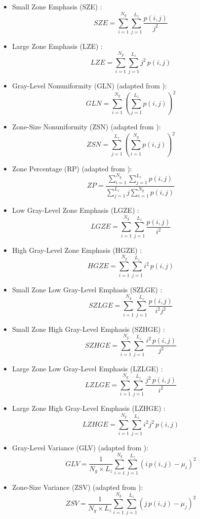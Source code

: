 \documentclass{article}
\begin{document}
\begin{itemize}
	\item Small Zone Emphasis (SZE) \cite{GallowayMM1975,ThibaultG2009}:
		  \[SZE = \sum_{i=1}^{N_g}\sum_{j=1}^{L_z} \frac{p(i,j)}{j^2}\]
	\item Large Zone Emphasis (LZE) \cite{GallowayMM1975,ThibaultG2009}:
		  \[LZE = \sum_{i=1}^{N_g}\sum_{j=1}^{L_z} j^2\,p(i,j)\]
	\item Gray-Level Nonuniformity (GLN) (adapted from \cite{GallowayMM1975,ThibaultG2009}):
		  \[GLN = \sum_{i=1}^{N_g}\left(\sum_{j=1}^{L_z} p(i,j)\right)^2\]
	\item Zone-Size Nonuniformity (ZSN) (adapted from \cite{GallowayMM1975,ThibaultG2009}):
		  \[ZSN = \sum_{j=1}^{L_z}\left(\sum_{i=1}^{N_g} p(i,j)\right)^2\]
	\item Zone Percentage (RP) (adapted from \cite{GallowayMM1975,ThibaultG2009}):
		  \[ZP = \frac{\sum_{i=1}^{N_g}\sum_{j=1}^{L_z} p(i,j)}{\sum_{j=1}^{L_z} j 
		  \sum_{i=1}^{N_g} p(i,j)}\]
	\item Low Gray-Level Zone Emphasis (LGZE) \cite{ChuA1990,ThibaultG2009}:
		  \[LGZE = \sum_{i=1}^{N_g}\sum_{j=1}^{L_z} \frac{p(i,j)}{i^2}\]
	\item High Gray-Level Zone Emphasis (HGZE) \cite{ChuA1990,ThibaultG2009}:
		  \[HGZE = \sum_{i=1}^{N_g}\sum_{j=1}^{L_z} i^2\,p(i,j)\]
	\item Small Zone Low Gray-Level Emphasis (SZLGE) \cite{DasarathyBV1991,ThibaultG2009}:
		  \[SZLGE = \sum_{i=1}^{N_g}\sum_{j=1}^{L_z} \frac{p(i,j)}{i^2j^2}\]
	\item Small Zone High Gray-Level Emphasis (SZHGE) \cite{DasarathyBV1991,ThibaultG2009}:
		  \[SZHGE = \sum_{i=1}^{N_g}\sum_{j=1}^{L_z} \frac{i^2\,p(i,j)}{j^2}\]
	\item Large Zone Low Gray-Level Emphasis (LZLGE) \cite{DasarathyBV1991,ThibaultG2009}:
		  \[LZLGE = \sum_{i=1}^{N_g}\sum_{j=1}^{L_z} \frac{j^2\,p(i,j)}{i^2}\]
	\item Large Zone High Gray-Level Emphasis (LZHGE) \cite{DasarathyBV1991,ThibaultG2009}:
		  \[LZHGE = \sum_{i=1}^{N_g}\sum_{j=1}^{L_z} i^2j^2\,p(i,j)\]
	\item Gray-Level Variance (GLV) (adapted from \cite{ThibaultG2009}):
		  \[GLV = \frac{1}{N_g \times L_z} \sum_{i=1}^{N_g}\sum_{j=1}^{L_z} 
		  \left(i\,p(i,j)-\mu_i\right)^2\]
	\item Zone-Size Variance (ZSV) (adapted from \cite{ThibaultG2009}):
		  \[ZSV = \frac{1}{N_g \times L_z} \sum_{i=1}^{N_g}\sum_{j=1}^{L_z} 
		  \left(j\,p(i,j)-\mu_j\right)^2\]
	\\
\end{itemize}
\end{document}
